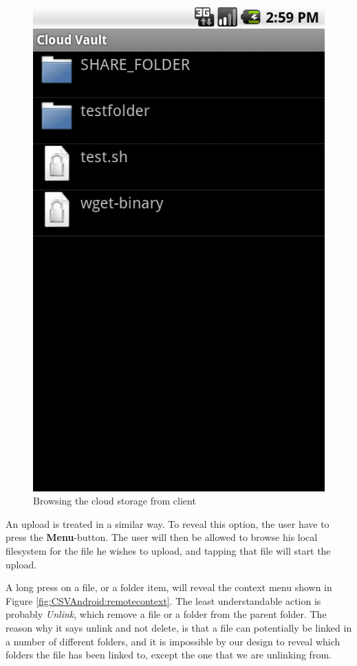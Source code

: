 \documentclass[pdftex,english,10pt,b5paper,twoside]{book}
\begin{document}
\begin{figure}[h!]
    \centering
    \includegraphics[scale=0.4]{client-remotebrowse.png}
    \caption{Browsing the cloud storage from client}
    \label{fig:CSVAndroid:remotebrowse}
\end{figure}

An upload is treated in a similar way. To reveal this option, the user have to
press the \textbf{Menu}-button. The user will then be allowed to browse his
local filesystem for the file he wishes to upload, and tapping that file will
start the upload. 

A long press on a file, or a folder item, will reveal the context menu shown in
Figure \ref{fig:CSVAndroid:remotecontext}. The least understandable action is
probably \emph{Unlink}, which remove a file or a folder from the parent folder.
The reason why it says unlink and not delete, is that a file can potentially be
linked in a number of different folders, and it is impossible by our design to
reveal which folders the file has been linked to, except the one that we are
unlinking from.
\end{document}
